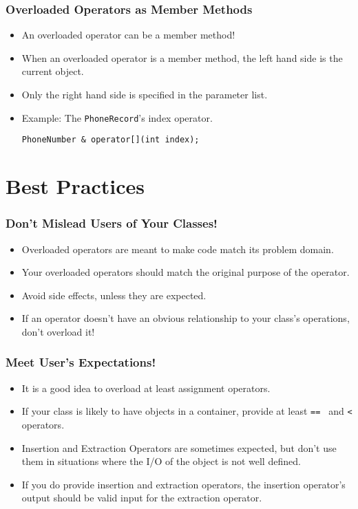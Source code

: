 \documentclass{beamer}
\begin{document}
\begin{frame}[fragile]
    \frametitle{Overloaded Operators as Member Methods}
    \begin{itemize}[<+->]
        \item An overloaded operator can be a member method!
        \item When an overloaded operator is a member method, the left
          hand side is the current object. 
        \item Only the right hand side is specified in the parameter list.
        \item Example: The {\tt PhoneRecord}'s index operator.
            \begin{verbatim}
PhoneNumber & operator[](int index);
            \end{verbatim}
    \end{itemize}
\end{frame}

\section{Best Practices}
\begin{frame}
    \frametitle{Don't Mislead Users of Your Classes!}
    \begin{itemize}[<+->]
        \item Overloaded operators are meant to make code match its
            problem domain.
        \item Your overloaded operators should match the original 
            purpose of the operator.
        \item Avoid side effects, unless they are expected.
        \item If an operator doesn't have an obvious relationship to 
            your class's operations, don't overload it!
    \end{itemize}
\end{frame}

\begin{frame}
    \frametitle{Meet User's Expectations!}
    \begin{itemize}[<+->]
        \item It is a good idea to overload at least assignment operators.
        \item If your class is likely to have objects in a container, provide
            at least {\tt == } and {\tt <} operators.
        \item Insertion and Extraction Operators are sometimes expected,
            but don't use them in situations where the I/O of the object
            is not well defined.
        \item If you do provide insertion and extraction operators, the
            insertion operator's output should be valid input for the
            extraction operator.
    \end{itemize}
\end{frame}
\end{document}
